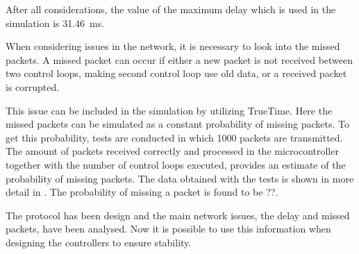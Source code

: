 After all considerations, the value of the maximum delay which is used in the simulation is \SI{31.46}{ms}.

When considering issues in the network, it is necessary to look into the missed packets. A missed packet can occur if either a new packet is not received between two control loops, making second control loop use old data, or a received packet is corrupted.

This issue can be included in the simulation by utilizing TrueTime. Here the missed packets can be simulated as a constant probability of missing packets. To get this probability, tests are conducted in which 1000 packets are transmitted. The amount of packets received correctly and processed in the microcontroller together with the number of control loops executed, provides an estimate of the probability of missing packets. The data obtained with the tests is shown in more detail in . The probability of missing a packet is found to be ??.

The protocol has been design and the main network issues, the delay and missed packets, have been analysed. Now it is possible to use this information when designing the controllers to ensure stability.


